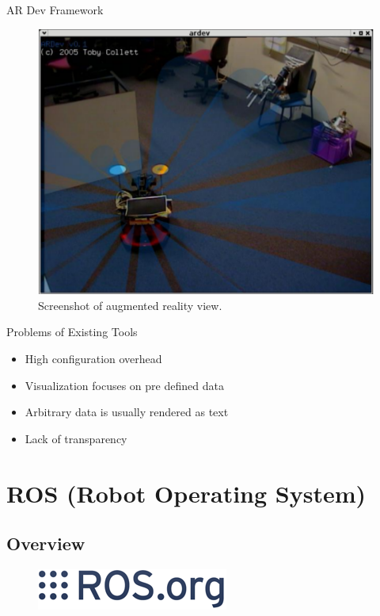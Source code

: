 \documentclass[compress]{beamer}
\begin{document}
\begin{frame}{AR Dev Framework}
\begin{figure}[htbp]
  \centering
  \includegraphics[width=.6\textwidth]{images/ar_view.png}
  \caption{Screenshot of augmented reality view. \cite{Collett2007}}
\end{figure}
\end{frame}

\begin{frame}{Problems of Existing Tools}
\begin{itemize}
\item High configuration overhead
\item Visualization focuses on pre defined data
\item Arbitrary data is usually rendered as text
\item Lack of transparency
\end{itemize}
\end{frame}

\section{ROS (Robot Operating System)}

\subsection{Overview}

\begin{frame}
\begin{figure}[htbp]
  \centering
  \includegraphics[width=.4\textwidth]{images/ros_logo.png}
\end{figure}
\end{frame}
\end{document}
